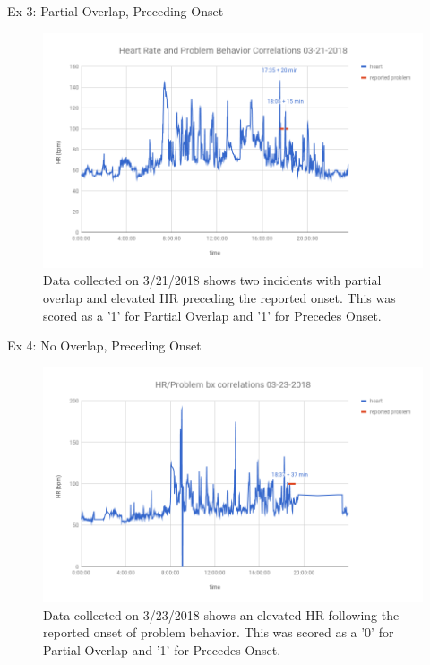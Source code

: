 \documentclass[final]{beamer}
\newlength{\onecolwid}
\newlength{\twocolwid}
\begin{document}
\begin{frame}[t]
\begin{columns}[t]
\begin{column}{\twocolwid}
\begin{columns}[t,totalwidth=\twocolwid]
\begin{column}{\onecolwid}
\begin{block}{Ex 3: Partial Overlap, Preceding Onset}
	\begin{figure}
		\includegraphics[width=0.8\linewidth]{Example3.png}
		\caption{Data collected on 3/21/2018 shows two incidents with partial overlap and elevated HR preceding the reported onset. This was scored as a '1' for Partial Overlap and '1' for Precedes Onset.}
	\end{figure}
	
\end{block}


\begin{block}{Ex 4: No Overlap, Preceding Onset}
	
	\begin{figure}
		\includegraphics[width=0.8\linewidth]{Example4.png}
		\caption{Data collected on 3/23/2018 shows an elevated HR following the reported onset of problem behavior. This was scored as a '0' for Partial Overlap and '1' for Precedes Onset.}
	\end{figure}
	
\end{block}


\end{column}
\end{columns}
\end{column}
\end{columns}
\end{frame}
\end{document}
